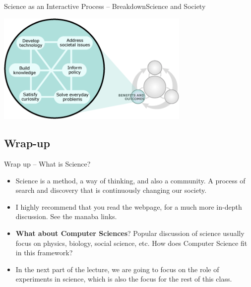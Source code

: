 \begin{frame}{Science as an Interactive Process -- Breakdown}{Science and Society}
  \begin{center}
    \includegraphics[width=0.7\textwidth]{../img/understandingscience_zoom4}
  \end{center}
\end{frame}

\subsection{Wrap-up}
\begin{frame}{Wrap up -- What is Science?}
  \begin{itemize}
    \item Science is a method, a way of thinking, and also a community. A process of search and discovery that is continuously changing our society.
    \item I highly recommend that you read the  webpage, for a much more in-depth discussion. See the manaba links.
    \item {\bf What about Computer Sciences}? Popular discussion of science usually focus on physics, biology, social science, etc. How does Computer Science fit in this framework?
    \vfill

    \item In the next part of the lecture, we are going to focus on the role of experiments in science, which is also the focus for the rest of this class.
  \end{itemize}
\end{frame}

